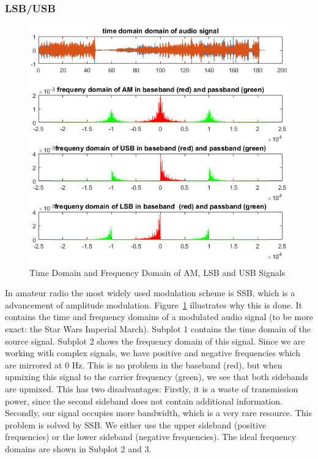 \subsubsection{LSB/USB}
\label{subsubsec:lsbusb}
\begin{figure}
	\centering
	\includegraphics[width=1.3\linewidth]{gfx/ssb_plots.png}
	\caption{Time Domain and Frequency Domain of AM, LSB and USB Signals}
	\label{fig:impl:f3ssb}
\end{figure}


In amateur radio the most widely used modulation scheme is \ac{SSB}, which is a advancement of amplitude modulation. Figure~\ref{fig:impl:f3ssb} illustrates why this is done. It contains the time and frequency domains of a modulated audio signal (to be more exact: the Star Wars Imperial March). Subplot 1 contains the time domain of the source signal. Subplot 2 shows the frequency domain of this signal. Since we are working with complex signals, we have positive and negative frequencies which are mirrored at 0 Hz. This is no problem in the baseband (red), but when upmixing this signal to the carrier frequency (green), we see that both sidebands are upmixed. This has two disadvantages: Firstly, it is a waste of transmission power, since the second sideband does not contain additional information. Secondly, our signal occupies more bandwidth, which is a very rare resource. 
This problem is solved by SSB. We either use the upper sideband (positive frequencies) or the lower sideband (negative frequencies). The ideal frequency domains are shown in Subplot 2 and 3. 

